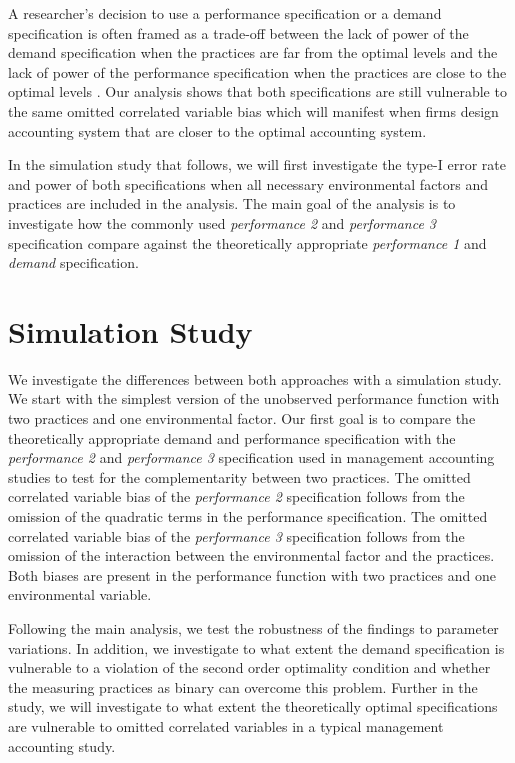 \documentclass[12pt]{article}
\begin{document}
A researcher's decision to use a performance specification or a demand specification is often framed as a trade-off between the lack of power of the demand specification when the practices are far from the optimal levels and the lack of power of the performance specification when the practices are close to the optimal levels \citep{Grabner2013,Aral2012,Johansson2018}. Our analysis shows that both specifications are still vulnerable to the same omitted correlated variable bias which will manifest when firms design accounting system that are closer to the optimal accounting system.

In the simulation study that follows, we will first investigate the type-I error rate and power of both specifications when all necessary environmental factors and practices are included in the analysis. The main goal of the analysis is to investigate how the commonly used \emph{performance 2} and \emph{performance 3} specification compare against the theoretically appropriate \emph{performance 1} and \emph{demand} specification.

\section{Simulation Study}\label{simulation-study}

We investigate the differences between both approaches with a simulation study. We start with the simplest version of the unobserved performance function with two practices and one environmental factor. Our first goal is to compare the theoretically appropriate demand and performance specification with the \emph{performance 2} and \emph{performance 3} specification used in management accounting studies to test for the complementarity between two practices. The omitted correlated variable bias of  the \emph{performance 2} specification follows from the omission of the quadratic terms in the performance specification. The omitted correlated variable bias of the \emph{performance 3} specification follows from the omission of the interaction between the environmental factor and the practices. Both biases are present in the performance function with two practices and one environmental variable. 

Following the main analysis, we test the robustness of the findings to parameter variations. In addition, we investigate to what extent the demand specification is vulnerable to a violation of the second order optimality condition and whether the measuring practices as binary can overcome this problem. Further in the study, we will investigate to what extent the theoretically optimal specifications are vulnerable to omitted correlated variables in a typical management accounting study. 
\end{document}
